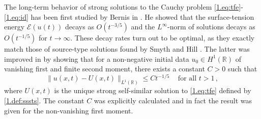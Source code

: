 \documentclass[12pt]{amsart}
\newcommand{\R}{{\mathbb R}}
\newcommand{\E}{\mathcal{E}}
\newcommand{\mass}{M}
\theoremstyle{plain}
\theoremstyle{definition}
\theoremstyle{remark}
\begin{document}
The long-term behavior of strong solutions to the Cauchy problem \eqref{1.eq:tfe}-\eqref{1.eq:id} has been first studied by Bernis in \cite{Ber96}. He showed that the surface-tension energy $\E(u(t))$ decays as $O(t^{-3/5})$ and the $L^\infty$-norm of solutions decays as $O(t^{-1/5})$ for $t\to \infty$. These decay rates turn out to be optimal, as they exactly match those of source-type solutions found by Smyth and Hill \cite{SmHi88}. %
The latter was improved in \cite[Theorem 5.1]{CaTo02} by showing that for a non-negative initial data $u_0\in H^1(\R)$ of vanishing first and finite second moment, there exists a constant $C>0$ such that
        \begin{equation*}
            \|u(x,t) - U(x,t)\|_{L^1(\R)} \leq C t^{-1/5}\,\quad\text{for all $t>1$}\,,
        \end{equation*}
where $U(x,t)$ is the unique strong self-similar solution to \eqref{1.eq:tfe} defined by \eqref{1.def:sssts}. The constant $C$ was explicitly calculated and in fact the result was given for the non-vanishing first moment.

\end{document}
